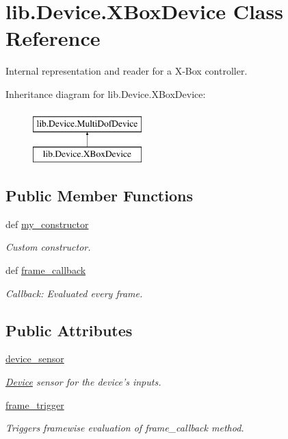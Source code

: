 \hypertarget{classlib_1_1Device_1_1XBoxDevice}{\section{lib.\-Device.\-X\-Box\-Device \-Class \-Reference}
\label{classlib_1_1Device_1_1XBoxDevice}
}


\-Internal representation and reader for a \-X-\/\-Box controller.  


\-Inheritance diagram for lib.\-Device.\-X\-Box\-Device\-:\begin{figure}[H]
\begin{center}
\leavevmode
\includegraphics[height=2.000000cm]{classlib_1_1Device_1_1XBoxDevice}
\end{center}
\end{figure}
\subsection*{\-Public \-Member \-Functions}
\begin{DoxyCompactItemize}
\item 
def \hyperlink{classlib_1_1Device_1_1XBoxDevice_a416d05b6cdef6b8f4a27f75c64d73eb2}{my\-\_\-constructor}
\begin{DoxyCompactList}\small\item\em \-Custom constructor. \end{DoxyCompactList}\item 
def \hyperlink{classlib_1_1Device_1_1XBoxDevice_a4f509463d7654ad9469024d69311a8e6}{frame\-\_\-callback}
\begin{DoxyCompactList}\small\item\em \-Callback\-: \-Evaluated every frame. \end{DoxyCompactList}\end{DoxyCompactItemize}
\subsection*{\-Public \-Attributes}
\begin{DoxyCompactItemize}
\item 
\hyperlink{classlib_1_1Device_1_1XBoxDevice_a7247268308b222d4b8fda7ffa6bc8cf8}{device\-\_\-sensor}
\begin{DoxyCompactList}\small\item\em \hyperlink{namespacelib_1_1Device}{\-Device} sensor for the device's inputs. \end{DoxyCompactList}\item 
\hyperlink{classlib_1_1Device_1_1XBoxDevice_ad310e2d3730d9d865af733d8c83c586b}{frame\-\_\-trigger}
\begin{DoxyCompactList}\small\item\em \-Triggers framewise evaluation of frame\-\_\-callback method. \end{DoxyCompactList}\end{DoxyCompactItemize}
